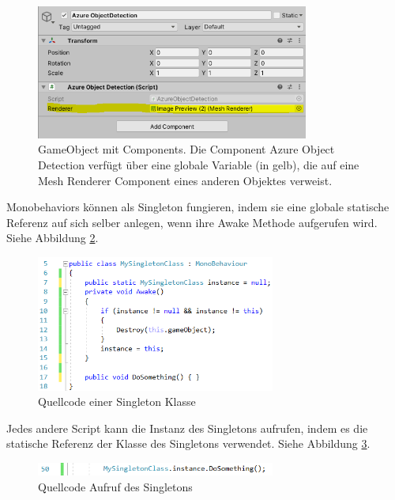 \begin{figure}[H]
	\centering
	\includegraphics[width=0.8\textwidth]{images/img_globalVars.png}
	\caption[Unity GameObject mit Components]{GameObject mit Components. Die Component Azure Object Detection verfügt über eine globale Variable (in gelb), die auf eine Mesh Renderer Component eines anderen Objektes verweist.}
	\label{img:gloabvars}
\end{figure}

Monobehaviors können als Singleton fungieren, indem sie eine globale statische Referenz auf sich selber anlegen, wenn ihre Awake Methode aufgerufen wird. Siehe Abbildung \ref{code:singleton}. %

\begin{figure}[H]
	\centering
	\includegraphics[width=0.7\textwidth]{images/code_singleton.png}
	\caption[Quellcode Singleton Klasse]{Quellcode einer Singleton Klasse}
	\label{code:singleton}
\end{figure}

Jedes andere Script kann die Instanz des Singletons aufrufen, indem es die statische Referenz der Klasse des Singletons verwendet. Siehe Abbildung \ref{code:singleton2}.

\begin{figure}[H]
	\centering
	\includegraphics[width=0.7\textwidth]{images/code_singleton2.png}
	\caption[Quellcode Aufrug des Singletons]{Quellcode Aufruf des Singletons}
	\label{code:singleton2}
\end{figure}

